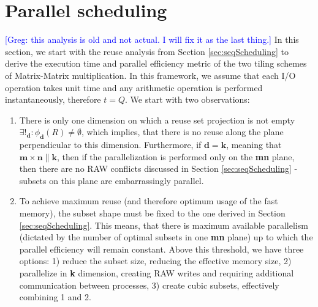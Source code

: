 \documentclass[sigplan,review,anonymous]{acmart}\settopmatter{printfolios=true,printccs=false,printacmref=false}
\newcommand\greg[1]{\textcolor{blue}{[Greg: #1]}}
\begin{document}
%

%




\appendix
\section{Parallel scheduling}
\greg{this analysis is old and not actual. I will fix it as the last thing.}
In this section, we start with the reuse analysis from Section 
\ref{sec:seqScheduling} 
to derive the execution time and parallel efficiency metric of the two tiling 
schemes of Matrix-Matrix multiplication. In this framework, we assume that each 
I/O operation takes unit time and any arithmetic operation is performed 
instantaneously, therefore $t = Q$. We start with two observations:

\begin{enumerate}
\item There is only one dimension on 
which a reuse set projection is not empty $\exists!_{\mathbf{d}}: 
\phi_{\mathbf{d}}(R) \ne 
\emptyset$, which implies, that there is no reuse along the plane 
perpendicular 
to this dimension. Furthermore, if $\mathbf{d} = \mathbf{k}$, meaning that 
$\mathbf{m} \times \mathbf{n} \parallel \mathbf{k}$, then if the 
parallelization is performed only on the \textbf{mn} plane, then there are 
no RAW 
conflicts discussed in Section \ref{sec:seqScheduling} - subsets on 
this 
plane are embarrassingly parallel. 
\item To achieve maximum reuse (and therefore optimum usage 
of the fast memory), the subset shape must be fixed to the one derived 
in 
Section \ref{sec:seqScheduling}. This means, that there is maximum 
available 
parallelism (dictated by the number of optimal subsets in one 
\textbf{mn} plane) up to which the parallel efficiency will remain 
constant. Above this threshold, we have three options: 1) reduce the 
subset size, reducing the effective memory size, 2) parallelize in 
\textbf{k} dimension, creating RAW writes and requiring additional 
communication between processes, 3) create cubic subsets, effectively 
combining 1 and 2.
\end{enumerate}
\end{document}
